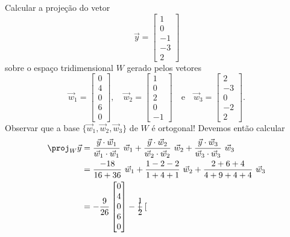 \begin{ex}
Calcular a projeção do vetor
\begin{equation}
\vec{y} =
\begin{bmatrix}
1 \\ 0 \\ -1 \\ -3 \\ 2
\end{bmatrix}
\end{equation} sobre o espaço tridimensional $W$ gerado pelos vetores
\begin{equation}
\vec{w}_1 =
\begin{bmatrix}
 0\\4\\0 \\ 6 \\0
\end{bmatrix}, \quad
\vec{w}_2 =
\begin{bmatrix}
 1\\0\\2\\0\\-1
\end{bmatrix} \quad \text{e} \quad
\vec{w}_3 =
\begin{bmatrix}
 2\\-3\\0\\-2\\ 2
\end{bmatrix}.
\end{equation} Observar que a base $\{\vec{w}_1, \vec{w}_2, \vec{w}_3\}$ de $W$ é ortogonal! Devemos então calcular
  \begin{align*}
\proj_W \vec{y} & = \frac{\vec{y} \cdot \vec{w}_1}{\vec{w}_1 \cdot \vec{w}_1} \ \vec{w}_1 + \frac{\vec{y} \cdot \vec{w}_2}{\vec{w}_2 \cdot \vec{w}_2} \ \vec{w}_2 + \frac{\vec{y} \cdot \vec{w}_3}{\vec{w}_3 \cdot \vec{w}_3} \ \vec{w}_3\\
                & = \frac{ -18 }{ 16 + 36 } \ \vec{w}_1 + \frac{ 1 - 2 - 2 }{ 1 + 4 + 1 } \ \vec{w}_2 + \frac{ 2 + 6 + 4 }{ 4 + 9 + 4 + 4 } \ \vec{w}_3 \\
                & = -\frac{9}{26} \begin{bmatrix}
 0\\4\\0 \\ 6 \\0
\end{bmatrix} - \frac{1}{2} \begin{bmatrix}

\end{bmatrix}
\end{align*}
\end{ex}
